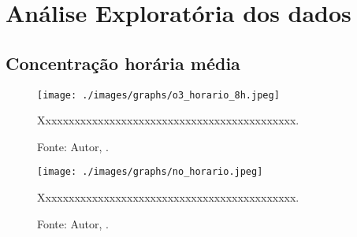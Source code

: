 \chapter{Análise Exploratória dos dados}



\lipsum[100]



\section{Concentração horária média}


\lipsum[100]




\begin{figure}[H]
    \centering
    \texttt{[image: ./images/graphs/o3\_horario\_8h.jpeg]}
    \caption{Xxxxxxxxxxxxxxxxxxxxxxxxxxxxxxxxxxxxxxxxxxxx.}
    \label{fig:o3_horario_8h.jpeg}
    \caption*{Fonte: Autor, \imprimirdata.}
\end{figure}




\lipsum[100]




\begin{figure}[H]
    \centering
    \texttt{[image: ./images/graphs/no\_horario.jpeg]}
    \caption{Xxxxxxxxxxxxxxxxxxxxxxxxxxxxxxxxxxxxxxxxxxxx.}
    \label{fig:no_horario.jpeg}
    \caption*{Fonte: Autor, \imprimirdata.}
\end{figure}

